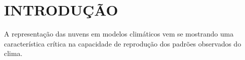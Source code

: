 \chapter{INTRODUÇÃO}

A representação das nuvens em modelos climáticos vem se mostrando uma característica crítica na capacidade de reprodução dos padrões observados do clima.



